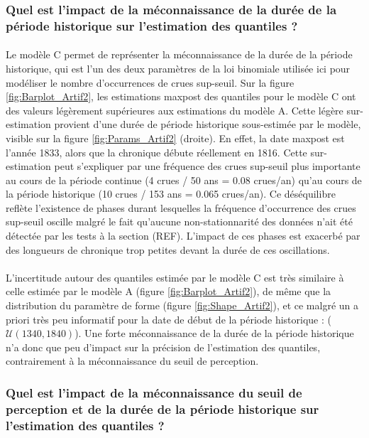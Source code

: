 \documentclass[11pt]{article}
\begin{document}
	\subsubsection{Quel est l'impact de la méconnaissance de la durée de la période historique sur l'estimation des quantiles ?}	
	
	\paragraph{} Le modèle C permet de représenter la méconnaissance de la durée de la période historique, qui est l'un des deux paramètres de la loi binomiale utilisée ici pour modéliser le nombre d'occurrences de crues sup-seuil. Sur la figure \ref{fig:Barplot_Artif2}, les estimations maxpost des quantiles pour le modèle C ont des valeurs légèrement supérieures aux estimations du modèle A. Cette légère sur-estimation provient d'une durée de période historique sous-estimée par le modèle, visible sur la figure \ref{fig:Params_Artif2} (droite). En effet, la date maxpost est l'année 1833, alors que la chronique débute réellement en 1816. Cette sur-estimation peut s'expliquer par une fréquence des crues sup-seuil plus importante au cours de la période continue (4 crues / 50 ans = 0.08 crues/an) qu'au cours de la période historique (10 crues / 153 ans = 0.065 crues/an). Ce déséquilibre reflète l'existence de phases durant lesquelles la fréquence d'occurrence des crues sup-seuil oscille malgré le fait qu'aucune non-stationnarité des données n'ait été détectée par les tests à la section (REF). L'impact de ces phases est exacerbé par des longueurs de chronique trop petites devant la durée de ces oscillations. 
	\paragraph{} L'incertitude autour des quantiles estimée par le modèle C est très similaire à celle estimée par le modèle A (figure \ref{fig:Barplot_Artif2}), de même que la distribution du paramètre de forme (figure \ref{fig:Shape_Artif2}), et ce malgré un a priori très peu informatif pour la date de début de la période historique : ($\mathcal{U}(1340,1840)$). Une forte méconnaissance de la durée de la période historique n'a donc que peu d'impact sur la précision de l'estimation des quantiles, contrairement à la méconnaissance du seuil de perception.
	
	\subsubsection{Quel est l'impact de la méconnaissance du seuil de perception et de la durée de la période historique sur l'estimation des quantiles ?}	
	
\end{document}
